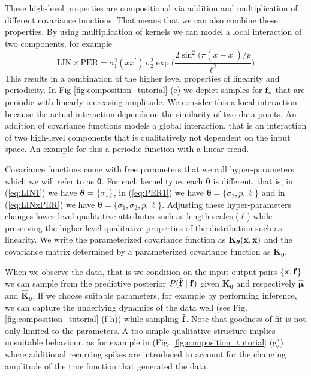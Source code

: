 These high-level properties are compositional via addition and multiplication of different covariance functions. 
That means that we can also combine these properties.
By using multiplication of kernels we can model a local interaction of two components, for example 
\begin{equation}\label{eq:LINxPER}
    \text{LIN} \times \text{PER} =  \sigma_1^2(x x^\prime)\, \sigma_2^2 \exp \bigg( \frac{2 \sin^2 ( \pi (x - x^\prime)/p}{\ell^2} \bigg) 
\end{equation}
This results in a combination of the higher level properties of linearity and  periodicity.
In Fig \ref{fig:composition_tutorial} (e) we depict samples for $\mathbf{f}_*$ that are periodic
with linearly increasing amplitude.
We consider this a local interaction because the actual interaction depends on the similarity
of two data points.
An addition of covariance functions models a global interaction, that is an interaction of two high-level components that is qualitatively not dependent on the input space. An example for this a periodic function with a linear
trend.

Covariance functions come with  free parameters that we call hyper-parameters which we will
refer to as $\bm{\theta}$.
For each kernel type, each $\bm{\theta}$ is different, that is, in (\ref{eq:LIN1}) we have $\bm{\theta}=\{\sigma_1\}$,
in (\ref{eq:PER1}) we have $\bm{\theta}=\{\sigma_2,p,\ell\}$ and in 
(\ref{eq:LINxPER}) we have $\bm{\theta}=\{\sigma_1,\sigma_2,p,\ell\}$.
Adjusting these hyper-parameters changes lower level qualitative attributes such as length
scales ($\ell$) while preserving the higher level qualitative properties of the distribution
such as linearity.
We write the parameterized covariance function as $\mathbf{K}_{\bm{\theta}}(\mathbf{x},\mathbf{x})$ and the
covariance matrix determined by a parameterized covariance function as $\mathbf{K}_{\bm{\theta}}$.

When we observe the data, that is we condition on the input-output pairs $\{\mathbf{x},\mathbf{f}\}$ we can sample from the 
predictive posterior $P(\hat{\mathbf{f}} \mid \mathbf{f})$ given $\mathbf{K}_{\bm{\theta}}$ and respectively $\bm{\hat{\mu}}$ and $\hat{\mathbf{K}}_{\bm{\theta}}$.
If we choose suitable parameters, for example by performing inference, we can capture the underlying dynamics of the data well (see Fig. \ref{fig:composition_tutorial} (f-h)) while sampling $\hat{\mathbf{f}}$.
Note that goodness of fit is not only limited to the parameters. A too simple qualitative structure
implies unsuitable behaviour, as for example in (Fig. \ref{fig:composition_tutorial} (g)) where additional 
recurring spikes are introduced to account for the changing amplitude of the true function that 
generated the data.





